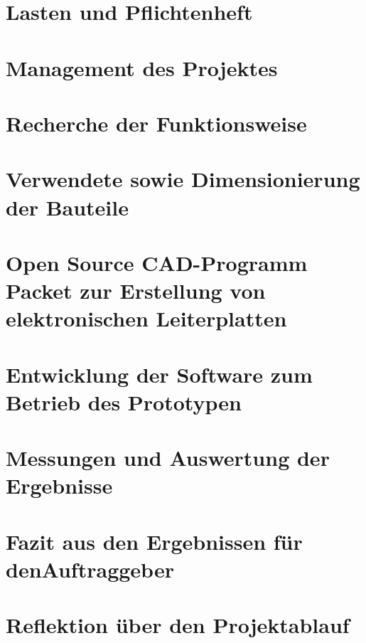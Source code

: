 \documentclass [11pt,a4paper,bibliography=totoc]{scrreprt}%
\begin{document}
\thispagestyle{empty}

\newpage
\thispagestyle{empty}

\setcounter{page}{0}
\newpage 
{} 
\tableofcontents 
\newpage
\newpage
\setcounter{page}{0}

\chapter{Lasten und Pflichtenheft}

\chapter{Management des Projektes}

\chapter{Recherche der Funktionsweise}

\chapter{Verwendete sowie Dimensionierung der Bauteile}

\chapter{Open Source CAD-Programm Packet zur Erstellung von elektronischen Leiterplatten}

\chapter{Entwicklung der Software zum Betrieb des Prototypen}

\chapter{Messungen und Auswertung der Ergebnisse}

%
\chapter{Fazit aus den Ergebnissen für denAuftraggeber}

\chapter{Reflektion über den Projektablauf}

\end{document}
